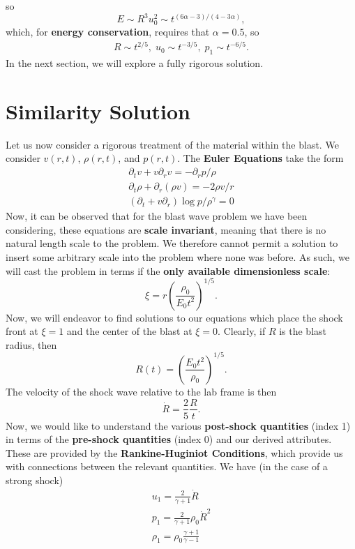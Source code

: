so 
\[
E \sim R^3u_0^2 \sim t^{(6\alpha -3)/(4-3\alpha)},
\]
which, for \textbf{energy conservation}, requires that $\alpha = 0.5$, so
\begin{equation}
    \boxed{
    \begin{aligned}
        R\sim t^{2/5},\; u_0\sim t^{-3/5},\;p_1\sim t^{-6/5}.
    \end{aligned}
    }
\end{equation}
In the next section, we will explore a fully rigorous solution.

\section{Similarity Solution}
Let us now consider a rigorous treatment of the material within the blast. We consider $v(r,t)$, $\rho(r,t)$, and $p(r,t)$. The \textbf{Euler Equations} take the form
\[
\begin{aligned}
    \partial_t v + v\partial_r v = -\partial_rp / \rho\\
    \partial_t \rho + \partial_r (\rho v) = - 2\rho v/r\\
    \left(\partial_t + v\partial_r\right) \log p / \rho^\gamma = 0
\end{aligned}
\]
 Now, it can be observed that for the blast wave problem we have been considering, these equations are \textbf{scale invariant}, meaning that there is no natural length scale to the problem. We therefore cannot permit a solution to insert some arbitrary scale into the problem where none was before. As such, we will cast the problem in terms if the \textbf{only available dimensionless scale}:
\[
\xi = r \left(\frac{\rho_0}{E_0t^2}\right)^{1/5}.
\]
Now, we will endeavor to find solutions to our equations which place the shock front at $\xi = 1$ and the
center of the blast at $\xi = 0$. Clearly, if $R$ is the blast radius, then
\[
R(t) = \left(\frac{E_0t^2}{\rho_0}\right)^{1/5}.
\]
The velocity of the shock wave relative to the lab frame is then
\[
\dot{R} = \frac{2}{5} \frac{R}{t}. 
\]
Now, we would like to understand the various \textbf{post-shock quantities} (index 1) in terms of the \textbf{pre-shock quantities} (index 0) and our derived attributes. These are provided by the \textbf{Rankine-Huginiot Conditions}, which provide us with connections between the relevant quantities. We have (in the case of a strong shock)
\[
\begin{aligned}
    u_1 = \frac{2}{\gamma +1} \dot{R}\\
    p_1 = \frac{2}{\gamma +1} \rho_0 \dot{R}^2\\
    \rho_1 = \rho_0 \frac{\gamma +1}{\gamma -1}
\end{aligned}
\]
